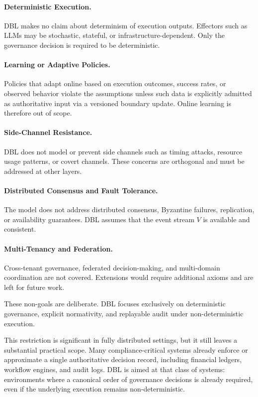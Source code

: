 \documentclass[11pt]{article}
\begin{document}
\paragraph{Deterministic Execution.}
DBL makes no claim about determinism of execution outputs. Effectors such as LLMs may be stochastic, stateful, or infrastructure-dependent. Only the governance decision is required to be deterministic.

\paragraph{Learning or Adaptive Policies.}
Policies that adapt online based on execution outcomes, success rates, or observed behavior violate the assumptions unless such data is explicitly admitted as authoritative input via a versioned boundary update. Online learning is therefore out of scope.

\paragraph{Side-Channel Resistance.}
DBL does not model or prevent side channels such as timing attacks, resource usage patterns, or covert channels. These concerns are orthogonal and must be addressed at other layers.

\paragraph{Distributed Consensus and Fault Tolerance.}
The model does not address distributed consensus, Byzantine failures, replication, or availability guarantees. DBL assumes that the event stream $V$ is available and consistent.

\paragraph{Multi-Tenancy and Federation.}
Cross-tenant governance, federated decision-making, and multi-domain coordination are not covered. Extensions would require additional axioms and are left for future work.

These non-goals are deliberate. DBL focuses exclusively on deterministic governance, explicit normativity, and replayable audit under non-deterministic execution.

This restriction is significant in fully distributed settings, but it still leaves a substantial practical scope. Many compliance-critical systems already enforce or approximate a single authoritative decision record, including financial ledgers, workflow engines, and audit logs. DBL is aimed at that class of systems: environments where a canonical order of governance decisions is already required, even if the underlying execution remains non-deterministic.
\end{document}
